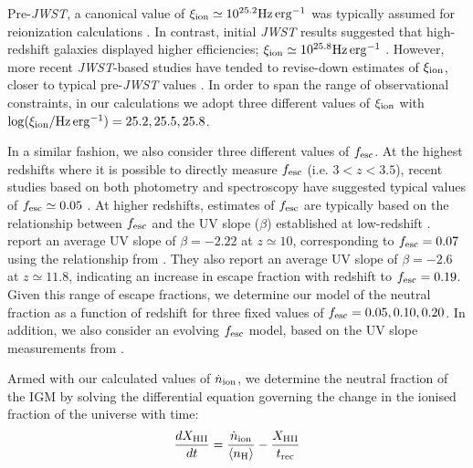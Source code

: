 \documentclass[fleqn,usenatbib]{mnras}
\begin{document}
Pre-\textit{JWST}, a canonical value of $\xi_{\rm ion}\simeq10^{25.2} \rm Hz\, erg^{-1}$ was typically assumed for reionization calculations \citep[e.g.][]{robertson2015,bouwens2016,matthee2017}. In contrast, initial \textit{JWST} results suggested that high-redshift galaxies displayed higher efficiencies; $\xi_{\rm ion}\simeq10^{25.8} \rm Hz\, erg^{-1}$ \citep[e.g.][]{atek2024,simmonds2024a}. However, more recent {\it JWST}-based studies have tended to revise-down estimates of $\xi_{\rm ion}$, closer
to typical pre-\textit{JWST} values \citep{simmonds2024b,pahl2024,begley2024}. In order to span the range of observational constraints, in our calculations we adopt three different values of $\xi_{\rm ion}$ with $\log(\xi_{\rm ion} / \mathrm{Hz\, erg^{-1}})=25.2, 25.5, 25.8$.

In a similar fashion, we also consider three different values of $f_{\rm esc}$. 
At the highest redshifts where it is possible to directly measure $f_{\rm esc}$ (i.e. $3<z<3.5$), recent studies based on both photometry and spectroscopy have suggested typical values of $f_{\rm esc}\simeq 0.05$ \citep[e.g.][]{pahl2021,begley2022}. At higher redshifts, estimates of $f_{\rm esc}$ are typically based on the relationship between $f_{\rm esc}$ and the UV slope ($\beta$) established at low-redshift \citep{chisholm2022}. \citet{cullen2023} report an average UV slope of $\beta=-2.22$ at $z\simeq10$, corresponding to $f_{\rm esc}=0.07$ using the relationship from \citet{chisholm2022}. They also report an average UV slope of $\beta=-2.6$ at $z\simeq11.8$, indicating an increase in escape fraction with redshift to $f_{\rm esc}=0.19$. Given this range of escape fractions, we determine our model of the neutral fraction as a function of redshift for three fixed values of $f_{\rm esc}=0.05,0.10,0.20$. In addition, we also consider an evolving $f_{\rm esc}$ model, based on the UV slope measurements from \citet{cullen2023}. 

Armed with our calculated values of $\Dot{n}_{\rm ion}$, we determine the neutral fraction of the IGM by solving the \citet{madau1999} differential equation governing the change in the ionised fraction of the universe with time:
\begin{equation}
    \frac{dX_{\rm HII}}{dt} = \frac{\dot{n}_{\rm ion}}{\langle n_{\rm H}\rangle} - \frac{X_{\rm HII}}{t_{\rm rec}}
\end{equation}
\end{document}
